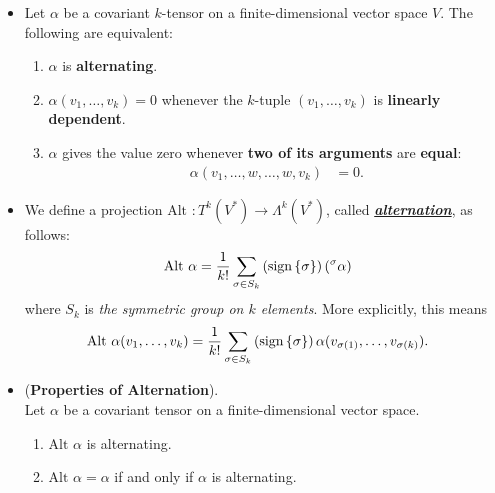 \documentclass[11pt]{article}
\begin{document}
\begin{itemize}
\item \begin{lemma}
Let $\alpha$ be a covariant $k$-tensor on a finite-dimensional vector space $V$. The following are equivalent:
\begin{enumerate}
\item $\alpha$ is \textbf{alternating}.
\item $\alpha(v_1,\ldots, v_k) = 0$ whenever the $k$-tuple $(v_1,\ldots, v_k)$ is \textbf{linearly dependent}.
\item $\alpha$ gives the value zero whenever \textbf{two of its arguments} are \textbf{equal}:
\begin{align*}
\alpha(v_1, \ldots, w, \ldots, w, v_k) &= 0.
\end{align*}
\end{enumerate}
\end{lemma}

\item \begin{definition}
We define a projection $\text{Alt }: T^k(V^{*}) \rightarrow \Lambda^k(V^{*})$, called \underline{\emph{\textbf{alternation}}}, as follows:
\begin{align*}
\text{Alt }\alpha &=\frac{1}{k!} \sum_{\sigma \in S_k} \left(\text{sign}\left\{\sigma\right\}\right)\left(^{\sigma}\alpha\right)
\end{align*} where $S_k$ is \emph{the symmetric group on $k$ elements}. More explicitly, this means
\begin{align*}
\text{Alt }\alpha(v_1, \ldots, v_k) &= \frac{1}{k!} \sum_{\sigma \in S_k} \left(\text{sign}\left\{\sigma\right\}\right)\alpha(v_{\sigma(1)}, \ldots, v_{\sigma(k)}).
\end{align*}
\end{definition}

\item \begin{proposition}(\textbf{Properties of Alternation}). \\
Let $\alpha$ be a covariant tensor on a finite-dimensional vector space.
\begin{enumerate}
\item $\text{Alt }\alpha$ is alternating.
\item $\text{Alt }\alpha = \alpha$ if and only if $\alpha$ is alternating.
\end{enumerate}
\end{proposition}
\end{itemize}
\end{document}
